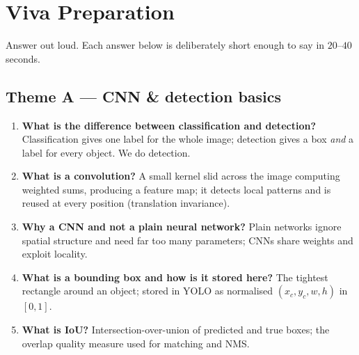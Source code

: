 \chapter{Viva Preparation}
\label{ch:viva}
Answer out loud. Each answer below is deliberately short enough to say in
$20$--$40$ seconds.

\section{Theme A --- CNN \& detection basics}
\begin{enumerate}
  \item \textbf{What is the difference between classification and
        detection?} Classification gives one label for the whole image;
        detection gives a box \emph{and} a label for every object. We do
        detection.
  \item \textbf{What is a convolution?} A small kernel slid across the
        image computing weighted sums, producing a feature map; it
        detects local patterns and is reused at every position
        (translation invariance).
  \item \textbf{Why a CNN and not a plain neural network?} Plain
        networks ignore spatial structure and need far too many
        parameters; CNNs share weights and exploit locality.
  \item \textbf{What is a bounding box and how is it stored here?} The
        tightest rectangle around an object; stored in YOLO as
        normalised $(x_c,y_c,w,h)$ in $[0,1]$.
  \item \textbf{What is IoU?} Intersection-over-union of predicted and
        true boxes; the overlap quality measure used for matching and NMS.
\end{enumerate}

